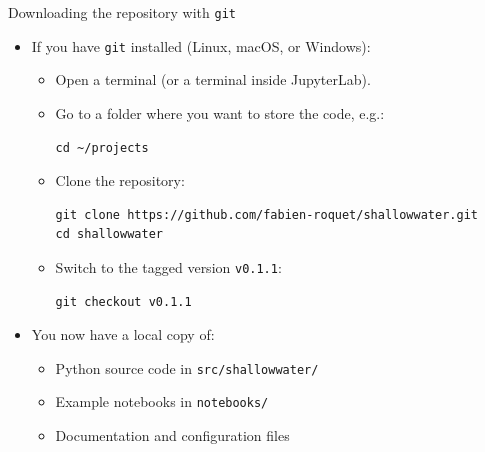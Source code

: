\documentclass[]{beamer}
\begin{document}
\begin{frame}[fragile,shrink=8]{Downloading the repository with \texttt{git}}
\begin{itemize}
  \item If you have \texttt{git} installed (Linux, macOS, or Windows):

    \begin{itemize}
      \item Open a terminal (or a terminal inside JupyterLab).
      \item Go to a folder where you want to store the code, e.g.:
\begin{verbatim}
cd ~/projects
\end{verbatim}
      \item Clone the repository:
\begin{verbatim}
git clone https://github.com/fabien-roquet/shallowwater.git
cd shallowwater
\end{verbatim}
      \item Switch to the tagged version \texttt{v0.1.1}:
\begin{verbatim}
git checkout v0.1.1
\end{verbatim}
    \end{itemize}

  \item You now have a local copy of:
    \begin{itemize}
      \item Python source code in \texttt{src/shallowwater/}
      \item Example notebooks in \texttt{notebooks/}
      \item Documentation and configuration files
    \end{itemize}
\end{itemize}
\end{frame}
\end{document}
